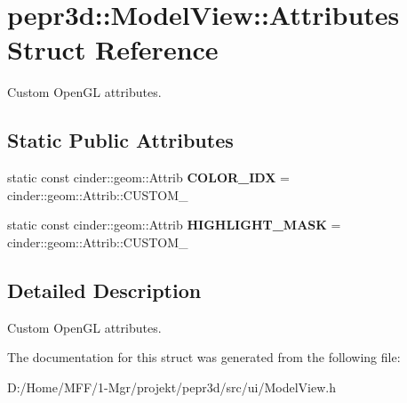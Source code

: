 \hypertarget{structpepr3d_1_1_model_view_1_1_attributes}{}\section{pepr3d\+::Model\+View\+::Attributes Struct Reference}
\label{structpepr3d_1_1_model_view_1_1_attributes}


Custom Open\+GL attributes.  


\subsection*{Static Public Attributes}
\begin{DoxyCompactItemize}
\item 
\mbox{\label{structpepr3d_1_1_model_view_1_1_attributes_a6dd0effe7c9edda9790ae4bd0ab9c47c}} 
static const cinder\+::geom\+::\+Attrib {\bfseries C\+O\+L\+O\+R\+\_\+\+I\+DX} = cinder\+::geom\+::\+Attrib\+::\+C\+U\+S\+T\+O\+M\+\_
\item 
\mbox{\label{structpepr3d_1_1_model_view_1_1_attributes_a41e9300964942d8c5ce120a104214c33}} 
static const cinder\+::geom\+::\+Attrib {\bfseries H\+I\+G\+H\+L\+I\+G\+H\+T\+\_\+\+M\+A\+SK} = cinder\+::geom\+::\+Attrib\+::\+C\+U\+S\+T\+O\+M\+\_
\end{DoxyCompactItemize}


\subsection{Detailed Description}
Custom Open\+GL attributes. 

The documentation for this struct was generated from the following file\+:\begin{DoxyCompactItemize}
\item 
D\+:/\+Home/\+M\+F\+F/1-\/\+Mgr/projekt/pepr3d/src/ui/Model\+View.\+h\end{DoxyCompactItemize}
